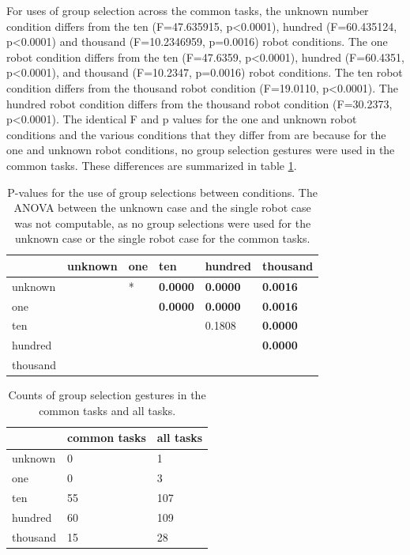 For uses of group selection across the common tasks, the unknown number condition differs from the ten (F=47.635915, p<0.0001), hundred (F=60.435124, p<0.0001) and thousand (F=10.2346959, p=0.0016) robot conditions. 
The one robot condition differs from the ten (F=47.6359, p<0.0001), hundred (F=60.4351, p<0.0001), and thousand (F=10.2347, p=0.0016) robot conditions.
The ten robot condition differs from the thousand robot condition (F=19.0110, p<0.0001).
The hundred robot condition differs from the thousand robot condition (F=30.2373, p<0.0001).
The identical F and p values for the one and unknown robot conditions and the various conditions that they differ from are because for the one and unknown robot conditions, no group selection gestures were used in the common tasks. 
These differences are summarized in table \ref{tab:group_select_per_task_norm}.

\begin{table}
	\begin{tabular}{l|l l l l l}
		& unknown & one    & ten        & hundred     & thousand   \\ 
		\hline
		unknown & & * & \textbf{0.0000} & \textbf{0.0000} & \textbf{0.0016} \\   
		one & & & \textbf{0.0000} & \textbf{0.0000} & \textbf{0.0016} \\
		ten & & & & 0.1808 & \textbf{0.0000}   \\
		hundred & & & & & \textbf{0.0000}   \\
		thousand & & & & &\\
	\end{tabular}
	\caption{P-values for the use of group selections between conditions. The ANOVA between the unknown case and the single robot case was not computable, as no group selections were used for the unknown case or the single robot case for the common tasks.}
	\label{tab:group_select_per_task_norm}
\end{table}

\begin{table}
	\begin{tabular}{l | l l}
		& common tasks & all tasks\\
		\hline
		unknown & 0 & 1\\
		one & 0 & 3\\
		ten & 55 & 107 \\
		hundred & 60 & 109\\
		thousand & 15 & 28\\
	\end{tabular}
	\caption{Counts of group selection gestures in the common tasks and all tasks.}
	\label{tab:group_raw_counts}
\end{table}

